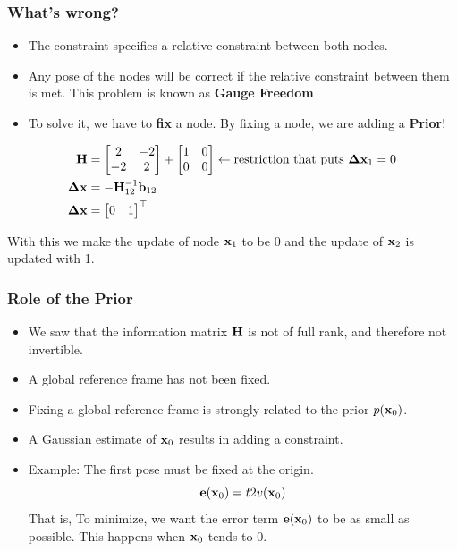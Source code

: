 \begin{frame}
    \frametitle{What's wrong?}
    
    \begin{itemize}
    \item The constraint specifies a relative constraint between both nodes.
    \item Any pose of the nodes will be correct if the relative constraint between them is met. This problem is known as {\bf Gauge Freedom}
    \item To solve it, we have to {\bf fix} a node. By fixing a node, we are adding a {\bf Prior}!
    \end{itemize}
    
    \begin{align*}
    \boldsymbol{\mathbf{H}} &=
    \begin{bmatrix}
    2 & -2\\
    -2 & 2
    \end{bmatrix}
    +
    \begin{bmatrix}
    1 & 0\\
    0 & 0
    \end{bmatrix} \leftarrow \text{restriction that puts } \boldsymbol{\mathbf{\Delta}}\boldsymbol{\mathbf{x}}_{1} = 0\\
    \boldsymbol{\mathbf{\Delta}}\boldsymbol{\mathbf{x}} &= -{\boldsymbol{\mathbf{H}}}^{-1}_{12} \boldsymbol{\mathbf{b}}_{12}\\
    \boldsymbol{\mathbf{\Delta}}\boldsymbol{\mathbf{x}} &=
    \begin{bmatrix}
    0 & 1
    \end{bmatrix}^{\top}
    \end{align*}
    
    With this we make the update of node $\boldsymbol{\mathbf{x}}_{1}$ to be 0 and the update of $\boldsymbol{\mathbf{x}}_{2}$ is updated with 1.
    \end{frame}
    
    \begin{frame}
    \frametitle{Role of the Prior}
    
    \begin{itemize}
    \item We saw that the information matrix $\boldsymbol{\mathbf{H}}$ is not of full rank, and therefore not invertible.
    \item A global reference frame has not been fixed.
    \item Fixing a global reference frame is strongly related to the prior $p(\boldsymbol{\mathbf{x}}_{0})$.
    \item A Gaussian estimate of $\boldsymbol{\mathbf{x}}_{0}$ results in adding a constraint.
    \item Example: The first pose must be fixed at the origin.
    \begin{equation*}
    \boldsymbol{\mathbf{e}}(\boldsymbol{\mathbf{x}}_{0}) = t2v(\boldsymbol{\mathbf{x}}_{0})
    \end{equation*}
    That is, To minimize, we want the error term $\boldsymbol{\mathbf{e}}(\boldsymbol{\mathbf{x}}_{0})$ to be as small as possible. This happens when $\boldsymbol{\mathbf{x}}_{0}$ tends to 0.
    \end{itemize}
    
    \end{frame}
    
